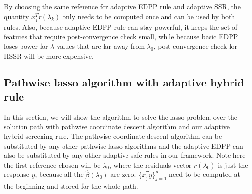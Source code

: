 By choosing the same reference for adaptive EDPP rule and adaptive SSR, the quantity $x_j^Tr(\lambda_k)$ only needs to be computed once and can be used by both rules. Also, because adaptive EDPP rule can stay powerful, it keeps the set of features that require post-convergence check small, while because basic EDPP loses power for $\lambda$-values that are far away from $\lambda_0$, post-convergence check for HSSR will be more expensive.

\subsection{Pathwise lasso algorithm with adaptive hybrid rule}

In this section, we will show the algorithm to solve the lasso problem over the solution path with pathwise coordinate descent algorithm and our adaptive hybrid screening rule. The pathwise coordinate descent algorithm can be substituted by any other pathwise lasso algorithms and the adaptive EDPP can also be substituted by any other adaptive safe rules in our framework. Note here the first reference chosen will be $\lambda_0$, where the residuals vector $r(\lambda_0)$ is just the response $y$, because all the $\hat{\beta}(\lambda_0)$ are zero. $\{x_j^Ty\}_{j=1}^p$ need to be computed at the beginning and stored for the whole path.

